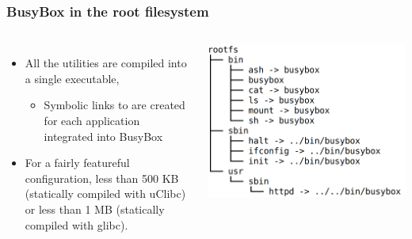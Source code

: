 \begin{frame}
  \frametitle{BusyBox in the root filesystem}
  \begin{columns}
      \begin{itemize}
      \item All the utilities are compiled into a single executable,
        \begin{itemize}
        \item Symbolic links to  are created for each
          application integrated into BusyBox
        \end{itemize}
      \item For a fairly featureful configuration, less than 500 KB
        (statically compiled with uClibc) or less than 1 MB (statically
        compiled with glibc).
      \end{itemize}
      \includegraphics[width=\textwidth]{slides/linux-busybox/busybox-tree.png}
  \end{columns}
\end{frame}

